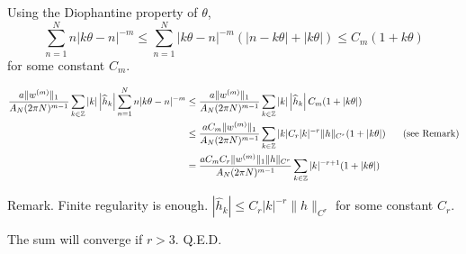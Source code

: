 \documentclass[12pt]{article}
\newcommand{\Z}{\mathbb{Z}}
\newcommand{\hk}{\widehat{h}_k}
\begin{document}
Using the Diophantine property of $\theta$, $$\sum_{n=1}^{N} n |k\theta-n|^{-m} \leq \sum_{n=1}^{N} |k\theta-n|^{-m} (|n-k\theta|+|k\theta|) \leq C_m (1+k\theta)$$ for some constant $C_m$.

\begin{equation*}\begin{split}
\frac{a\|w^{(m)}\|_1}{A_N (2\pi N)^{m-1}} \sum_{k\in\Z} |k| \left| \hk \right| \sum_{n=1}^{N} n |k\theta-n|^{-m} 
& \leq \frac{a\|w^{(m)}\|_1}{A_N (2\pi N)^{m-1}} \sum_{k\in\Z} |k| \left| \hk \right| C_m(1+|k\theta|)\\
& \leq \frac{aC_m\|w^{(m)}\|_1}{A_N (2\pi N)^{m-1}} \sum_{k\in\Z} |k| C_r |k|^{-r}\|h\|_{C^r} (1+|k\theta|) \text{\hspace{0.2in} (see Remark)}\\
& = \frac{a C_m C_r\|w^{(m)}\|_1\|h\|_{C^r}}{A_N (2\pi N)^{m-1}} \sum_{k\in\Z} |k|^{-r+1} (1+|k\theta|)
\end{split}\end{equation*}

Remark. Finite regularity is enough. $|\hk|\leq C_r |k|^{-r}\|h\|_{C^r}$ for some constant $C_r$. 

The sum will converge if $r>3$. Q.E.D.
\end{document}
